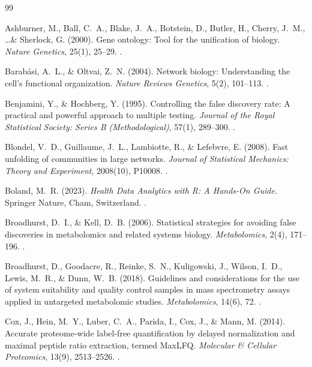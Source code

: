 \documentclass[11pt,oneside]{book}
\begin{document}
\begin{thebibliography}{99}

Ashburner, M., Ball, C.~A., Blake, J.~A., Botstein, D., Butler, H., Cherry, J.~M., \dots \& Sherlock, G. (2000). Gene ontology: Tool for the unification of biology. \textit{Nature Genetics}, 25(1), 25--29. .

Barab\'asi, A.~L., \& Oltvai, Z.~N. (2004). Network biology: Understanding the cell's functional organization. \textit{Nature Reviews Genetics}, 5(2), 101--113. .

Benjamini, Y., \& Hochberg, Y. (1995). Controlling the false discovery rate: A practical and powerful approach to multiple testing. \textit{Journal of the Royal Statistical Society: Series B (Methodological)}, 57(1), 289--300. .

Blondel, V.~D., Guillaume, J.~L., Lambiotte, R., \& Lefebvre, E. (2008). Fast unfolding of communities in large networks. \textit{Journal of Statistical Mechanics: Theory and Experiment}, 2008(10), P10008. .

Boland, M.~R. (2023). \textit{Health Data Analytics with R: A Hands-On Guide}. Springer Nature, Cham, Switzerland. .

Broadhurst, D.~I., \& Kell, D.~B. (2006). Statistical strategies for avoiding false discoveries in metabolomics and related systems biology. \textit{Metabolomics}, 2(4), 171--196. .

Broadhurst, D., Goodacre, R., Reinke, S.~N., Kuligowski, J., Wilson, I.~D., Lewis, M.~R., \& Dunn, W.~B. (2018). Guidelines and considerations for the use of system suitability and quality control samples in mass spectrometry assays applied in untargeted metabolomic studies. \textit{Metabolomics}, 14(6), 72. .

Cox, J., Hein, M.~Y., Luber, C.~A., Parida, I., Cox, J., \& Mann, M. (2014). Accurate proteome-wide label-free quantification by delayed normalization and maximal peptide ratio extraction, termed MaxLFQ. \textit{Molecular \& Cellular Proteomics}, 13(9), 2513--2526. .


\end{thebibliography}
\end{document}
